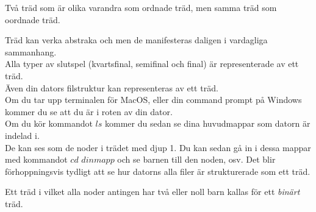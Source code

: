 \documentclass[nobib]{tufte-handout}
\begin{document}
\begin{definition}
\begin{marginfigure}
        \caption{Två träd som är olika varandra som ordnade träd, men samma träd som oordnade träd.}
        \label{fig:distinct_only_as_ordered}
    \end{marginfigure}
\end{definition}

\begin{example}
    Träd kan verka abstraka och men de manifesteras daligen i vardagliga sammanhang. \\Alla typer av slutspel (kvartsfinal, semifinal och final) är representerade av ett träd. \\Även din dators filstruktur kan representeras av ett träd.\\ Om du tar upp terminalen för MacOS, eller din command prompt på Windows kommer du se att du är i roten av din dator.\\ Om du kör kommandot $ls$ kommer du sedan se dina huvudmappar som datorn är indelad i.\\De kan ses som de noder i trädet med djup 1. Du kan sedan gå in i dessa mappar med kommandot $cd$ $dinmapp$ och se barnen till den noden, osv. Det blir förhoppningsvis tydligt att se hur datorns alla filer är strukturerade som ett träd. \\  
\end{example}

\begin{definition}
    Ett träd i vilket alla noder antingen har två eller noll barn kallas för ett \emph{binärt} träd.
\end{definition}
\end{document}

